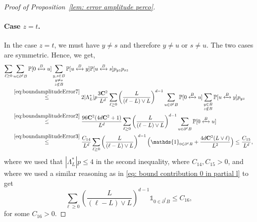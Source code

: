 \documentclass[11pt,a4paper]{article}
\numberwithin{equation}{section}
\theoremstyle{plain}
\theoremstyle{definition}
\newcommand\bfC{\mathbf{C}}
\newcommand{\connect}{\xleftrightarrow}
\begin{document}
\begin{proof}[Proof of Proposition~\textup{\ref{lem: error amplitude perco}}]
%

\paragraph{Case $z=t$.} In the case $z=t$, we must have $y\neq s$ and therefore $y\neq u$ or $s\neq u$. The two cases are symmetric. Hence, we get,
 \begin{align}
 	\sum_{\ell\geq 0}&\sum_{u\in \partial^\ell B}\mathbb P[0\connect{B\:}u]\sum_{\substack{y,s\in B\\y\neq s\\ z\notin B}}\mathbb P[u\connect{B\:}y]\mathbb P[u\connect{B\:}s]p_{yz}p_{sz}\notag
 	\\&\stackrel{\eqref{eq:boundamplitudeError7}}\leq 2|\Lambda_L^*|p\frac{3\bfC^2}{L^d}\sum_{\ell\geq 0}\left(\frac{L}{(\ell-L)\vee L}\right)^{d-1}\sum_{u\in \partial^\ell B}\mathbb P[0\connect{B\:}u]\sum_{\substack{y\in B\\z\notin B}}\mathbb P[u\connect{B\:}y]p_{yz}\notag
 	\\&\stackrel{\eqref{eq:boundamplitudeError2}}\le \frac{96\bfC^2(4d\bfC^2+1)}{L^d}\sum_{\ell\geq 0}\left(\frac{L}{(\ell-L)\vee L}\right)^{d-1}\sum_{u\in \partial^\ell B}\mathbb P[0\connect{B\:}u]\notag
 	\\&\stackrel{\eqref{eq:boundamplitudeError3}}\leq \frac{C_{14}}{L^d}\sum_{\ell\geq 0}\left(\frac{L}{(\ell-L)\vee L}\right)^{d-1}\Big(\mathds{1}_{0\in \partial^\ell B}+\frac{4d\bfC^2(L\vee \ell)}{L^2}\Big) \leq \frac{C_{15}}{L^d},\label{eq:boundamplitudeError5}
 \end{align}
 where we used that $|\Lambda_L^*|p\leq 4$ in the second inequality, where $C_{14},C_{15}>0$, and where we used a similar reasoning as in \eqref{eq: bound contribution 0 in partial l} to get
 \begin{equation}
 	\sum_{\ell\geq 0}\left(\frac{L}{(\ell-L)\vee L}\right)^{d-1}\mathds{1}_{0\in \partial^\ell B}\leq C_{16},
 \end{equation}
 for some $C_{16}>0$.
 



\end{proof}
\end{document}
